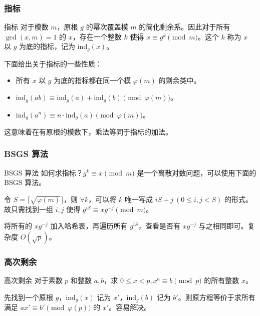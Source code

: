 \documentclass[../main.tex]{subfiles}
\begin{document}
\subsubsection{指标}

\begin{frame}{指标}
对于模数 $m$，原根 $g$ 的幂次覆盖模 $m$ 的简化剩余系。因此对于所有 $\gcd(x,m)=1$ 的 $x$，存在一个整数 $k$ 使得 $x\equiv g^k\pmod m$。这个 $k$ 称为 $x$ 以 $g$ 为底的指标，记为 $\mathrm{ind}_g(x)$。\pause

下面给出关于指标的一些性质：\pause

\begin{itemize}
\item 所有 $x$ 以 $g$ 为底的指标都在同一个模 $\varphi(m)$ 的剩余类中。\pause
\item $\mathrm{ind}_g(ab)\equiv \mathrm{ind}_g(a)+\mathrm{ind}_g(b)\pmod {\varphi(m)}$。\pause
\item $\mathrm{ind}_g(a^n)\equiv n\cdot \mathrm{ind}_g(a)\pmod{\varphi(m)}$。
\end{itemize}\pause

这意味着在有原根的模数下，乘法等同于指标的加法。
\end{frame}

\subsubsection{BSGS 算法}

\begin{frame}{BSGS 算法}
如何求指标？$g^k\equiv x\pmod m$ 是一个离散对数问题，可以使用下面的 BSGS 算法。\pause
\bigskip

令 $S=\lceil\sqrt{\varphi(m)}\rceil$，则 $\forall k$，可以将 $k$ 唯一写成 $iS+j\ (0\le i,j<S)$ 的形式。故只需找到一组 $i,j$ 使得 $g^{iS}\equiv xg^{-j}\pmod m$。\pause

将所有的 $xg^{-j}$ 加入哈希表，再遍历所有 $g^{iS}$，查看是否有 $xg^{-j}$ 与之相同即可。复杂度 $O(\sqrt{p})$。
\end{frame}

\subsubsection{高次剩余}

\begin{frame}{高次剩余}
对于素数 $p$ 和整数 $a,b$，求 $0\le x<p,x^a\equiv b\pmod p$ 的所有整数 $x$。\pause
\bigskip

先找到一个原根 $g$，$\mathrm{ind}_g(x)$ 记为 $x'$，$\mathrm{ind}_g(b)$ 记为 $b'$。则原方程等价于求所有满足 $ax'\equiv b'\pmod {\varphi(p)}$ 的 $x'$。容易解决。
\end{frame}
\end{document}
